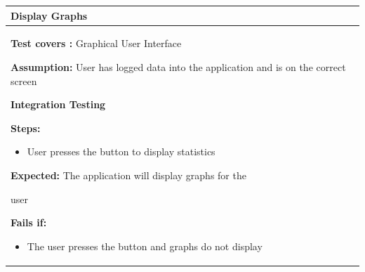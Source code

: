 \documentclass[letterpaper,english, 12pt]{scrreprt}
\begin{document}
\begin{center}
        \begin{tabular}{|C{15cm}|}
                \hline
                        \textbf{Display Graphs}\\
                \hline
                        \begin{flushleft}
                                \textbf{Test covers : } Graphical User Interface
                        \end{flushleft}
                        \begin{flushleft}
                                \textbf{Assumption: } User has logged data into the application and is on the correct screen
                        \end{flushleft}
			\begin{center}
				\textbf{Integration Testing}
			\end{center}
                        \begin{flushleft}
                                \textbf{Steps:}
                        \end{flushleft}
				\begin{itemize}
					\item User presses the button to display statistics
				\end{itemize}
			\begin{flushleft}
				\textbf{Expected: } The application will display graphs for the
			\end{flushleft} user
                        \begin{flushleft}
                                \textbf{Fails if: }
                        \end{flushleft}
                                \begin{itemize}
                                        \item The user presses the button and graphs do not display
                                \end{itemize}
				\\
		\hline
        \end{tabular}
\end{center}
\end{document}
